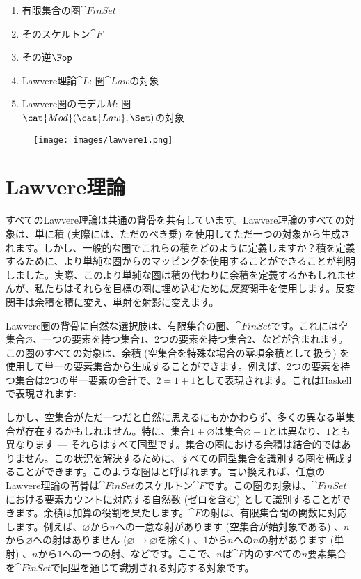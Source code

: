 \begin{enumerate}
  \tightlist
  \item
        有限集合の圏$\cat{FinSet}$
  \item
        そのスケルトン$\cat{F}$
  \item
        その逆$\Fop$
  \item
        Lawvere理論$\cat{L}$: 圏$\cat{Law}$の対象
  \item
        Lawvere圏のモデル$M$: 圏\\
        $\cat{Mod}(\cat{Law}, \Set)$の対象
\end{enumerate}

\begin{figure}[H]
  \centering
  \texttt{[image: images/lawvere1.png]}
\end{figure}

\section{Lawvere理論}

すべてのLawvere理論は共通の背骨を共有しています。Lawvere理論のすべての対象は、単に積 (実際には、ただのべき乗) を使用してただ一つの対象から生成されます。しかし、一般的な圏でこれらの積をどのように定義しますか？積を定義するために、より単純な圏からのマッピングを使用することができることが判明しました。実際、このより単純な圏は積の代わりに余積を定義するかもしれませんが、私たちはそれらを目標の圏に埋め込むために\emph{反変}関手を使用します。反変関手は余積を積に変え、単射を射影に変えます。

Lawvere圏の背骨に自然な選択肢は、有限集合の圏、$\cat{FinSet}$です。これには空集合$\varnothing$、一つの要素を持つ集合$1$、2つの要素を持つ集合$2$、などが含まれます。この圏のすべての対象は、余積 (空集合を特殊な場合の零項余積として扱う) を使用して単一の要素集合から生成することができます。例えば、2つの要素を持つ集合は2つの単一要素の合計で、$2 = 1 + 1$として表現されます。これはHaskellで表現されます: 

しかし、空集合がただ一つだと自然に思えるにもかかわらず、多くの異なる単集合が存在するかもしれません。特に、集合$1 + \varnothing$は集合$\varnothing + 1$とは異なり、$1$とも異なります --- それらはすべて同型です。集合の圏における余積は結合的ではありません。この状況を解決するために、すべての同型集合を識別する圏を構成することができます。このような圏はと呼ばれます。言い換えれば、任意のLawvere理論の背骨は$\cat{FinSet}$のスケルトン$\cat{F}$です。この圏の対象は、$\cat{FinSet}$における要素カウントに対応する自然数 (ゼロを含む) として識別することができます。余積は加算の役割を果たします。$\cat{F}$の射は、有限集合間の関数に対応します。例えば、$\varnothing$から$n$への一意な射があります (空集合が始対象である) 、$n$から$\varnothing$への射はありません ($\varnothing \to \varnothing$を除く) 、$1$から$n$への$n$の射があります (単射) 、$n$から$1$への一つの射、などです。ここで、$n$は$\cat{F}$内のすべての$n$要素集合を$\cat{FinSet}$で同型を通じて識別される対応する対象です。

